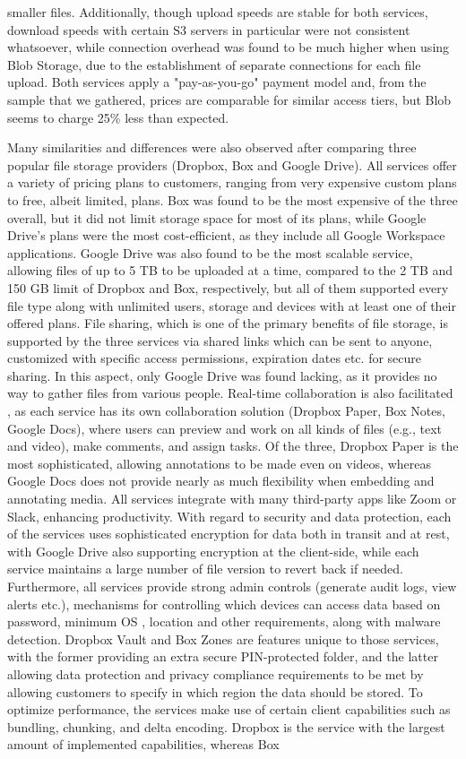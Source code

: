 smaller files. Additionally, though upload speeds are stable for both services, download speeds with certain S3 servers in particular were not consistent whatsoever, while connection overhead was found to be much higher when using Blob Storage, due to the establishment of separate connections for each file upload.  Both services apply a "pay-as-you-go" payment model and, from the sample that we gathered, prices are comparable for similar access tiers, but Blob seems to charge 25\% less than expected. 

Many similarities and differences were also observed after comparing three popular file storage providers (Dropbox, Box and Google Drive). All services offer a variety of pricing plans to customers, ranging from very expensive custom plans to free, albeit limited, plans. Box was found to be the most expensive of the three overall, but it did not limit storage space for most of its plans, while Google Drive's plans were the most cost-efficient, as they include all Google Workspace applications. Google Drive was also found to be the most scalable service, allowing files of up to 5 TB to be uploaded at a time, compared to the 2 TB and 150 GB limit of Dropbox and Box, respectively, but all of them supported every file type along with unlimited users, storage and devices with at least one of their offered plans.  File sharing, which is one of the primary benefits of file storage, is supported by the three services via shared links which can be sent to anyone, customized with specific access permissions, expiration dates etc. for secure sharing.  In this aspect, only Google Drive was found lacking, as it provides no way to gather files from various people.  Real-time collaboration is also facilitated , as each service has its own collaboration solution (Dropbox Paper, Box Notes, Google Docs), where users can preview and work on all kinds of files  (e.g., text and video), make comments, and assign tasks. Of the three, Dropbox Paper is the most sophisticated, allowing annotations to be made even on videos, whereas Google Docs does not provide nearly as much flexibility when embedding and annotating media. All services integrate with many third-party apps like Zoom or Slack, enhancing productivity. With regard to security and data protection, each of the services uses sophisticated encryption for data both in transit and at rest, with Google Drive also supporting encryption at the client-side, while each service maintains a large number of file version to revert back if needed. Furthermore, all services provide strong admin controls (generate audit logs, view alerts etc.), mechanisms for controlling which devices can access data based on password, minimum OS , location and other requirements, along with malware detection. Dropbox Vault  and Box Zones are features unique to those services, with the former providing an extra secure PIN-protected folder, and the latter allowing data protection and privacy compliance requirements to be met by allowing customers to specify in which region the data should be stored. To optimize performance, the services make use of certain client capabilities such as bundling, chunking, and delta encoding. Dropbox is the service with the largest amount of implemented capabilities, whereas Box 